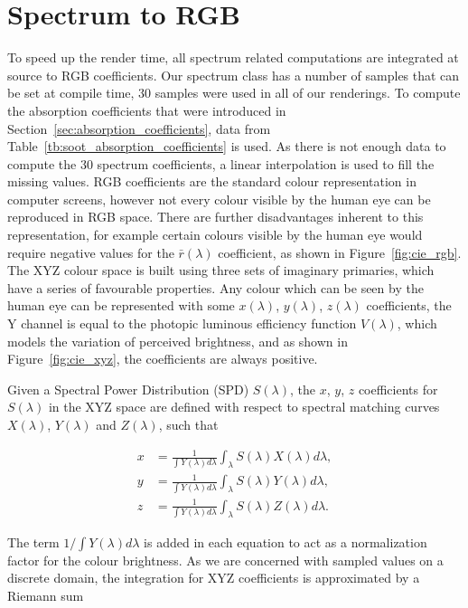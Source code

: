 \section{Spectrum to RGB}
\label{sec:spectrum_to_rgb}

To speed up the render time, all spectrum related computations are integrated at source to RGB coefficients.
Our spectrum class has a number of samples that can be set at compile time, 30 samples were used in all of our renderings.
To compute the absorption coefficients that were introduced in Section~\ref{sec:absorption_coefficients}, data from Table~\ref{tb:soot_absorption_coefficients} is used.
As there is not enough data to compute the 30 spectrum coefficients, a linear interpolation is used to fill the missing values.
RGB coefficients are the standard colour representation in computer screens, however not every colour visible by the human eye can be reproduced in RGB space.
There are further disadvantages inherent to this representation, for example certain colours visible by the human eye would require negative values for the $\bar{r}(\lambda)$ coefficient, as shown in Figure~\ref{fig:cie_rgb}.
The XYZ colour space is built using three sets of imaginary primaries, which have a series of favourable properties.
Any colour which can be seen by the human eye can be represented with some $x(\lambda)$, $y(\lambda)$, $z(\lambda)$ coefficients, the Y channel is equal to the photopic luminous efficiency function $V(\lambda)$, which models the variation of perceived brightness, and as shown in Figure~\ref{fig:cie_xyz}, the coefficients are always positive.

Given a Spectral Power Distribution (SPD) $S(\lambda)$, the $x$, $y$, $z$ coefficients for $S(\lambda)$ in the XYZ space are defined with respect to spectral matching curves $X(\lambda)$, $Y(\lambda)$ and $Z(\lambda)$, such that

\begin{equation}
\begin{split}
x &= \frac{1}{\int Y(\lambda) d\lambda} \int_\lambda S(\lambda) X(\lambda) d\lambda, \\
y &= \frac{1}{\int Y(\lambda) d\lambda} \int_\lambda S(\lambda) Y(\lambda) d\lambda, \\
z &= \frac{1}{\int Y(\lambda) d\lambda} \int_\lambda S(\lambda) Z(\lambda) d\lambda.
\end{split}
\end{equation}

The term $1 / \int Y(\lambda) d\lambda$ is added in each equation to act as a normalization factor for the colour brightness. 
As we are concerned with sampled values on a discrete domain, the integration for XYZ coefficients is approximated by a Riemann sum

